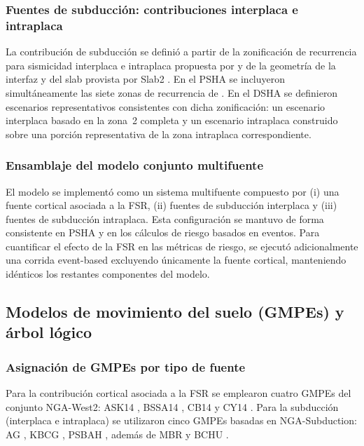 \subsubsection{Fuentes de subducción: contribuciones interplaca e intraplaca}
\label{sec:meto_subduccion}

La contribución de subducción se definió a partir de la zonificación de recurrencia para sismicidad interplaca e intraplaca propuesta por  y de la geometría de la interfaz y del slab provista por Slab2 . En el PSHA se incluyeron simultáneamente las siete zonas de recurrencia de . En el DSHA se definieron escenarios representativos consistentes con dicha zonificación: un escenario interplaca basado en la zona~2 completa y un escenario intraplaca construido sobre una porción representativa de la zona intraplaca correspondiente.

\subsubsection{Ensamblaje del modelo conjunto multifuente}
\label{sec:meto_ensamble}

El modelo se implementó como un sistema multifuente compuesto por (i) una fuente cortical asociada a la FSR, (ii) fuentes de subducción interplaca y (iii) fuentes de subducción intraplaca. Esta configuración se mantuvo de forma consistente en PSHA y en los cálculos de riesgo basados en eventos. Para cuantificar el efecto de la FSR en las métricas de riesgo, se ejecutó adicionalmente una corrida event-based excluyendo únicamente la fuente cortical, manteniendo idénticos los restantes componentes del modelo.

\subsection{Modelos de movimiento del suelo (GMPEs) y árbol lógico}
\label{sec:meto_gmpe_lt}

\subsubsection{Asignación de GMPEs por tipo de fuente}
\label{sec:meto_gmpe_asig}

Para la contribución cortical asociada a la FSR se emplearon cuatro GMPEs del conjunto NGA-West2: ASK14 , BSSA14 , CB14  y CY14 . Para la subducción (interplaca e intraplaca) se utilizaron cinco GMPEs basadas en NGA-Subduction: AG , KBCG , PSBAH , además de MBR  y BCHU .

